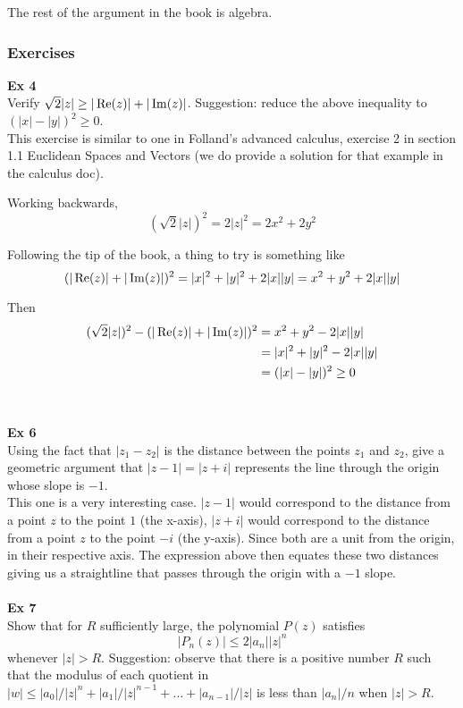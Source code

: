 The rest of the argument in the book is algebra.


\subsubsection{Exercises}

\textbf{Ex 4}
\\
Verify $\sqrt{2}|z| \geq |\operatorname{Re}(z)| + |\operatorname{Im}(z)|$.
Suggestion: reduce the above inequality to $(|x| - |y|)^2 \geq 0$.
\\

This exercise is similar to one in Folland's advanced calculus, exercise 2 in section 1.1 Euclidean Spaces and Vectors
(we do provide a solution for that example in the calculus doc).

Working backwards,
$$
(\sqrt{2} |z|)^2 = 2|z|^2 = 2x^2 + 2y^2
$$

Following the tip of the book, a thing to try is something like
$$
(|\operatorname{Re}(z)| + |\operatorname{Im}(z)|)^2 = |x|^2 + |y|^2 + 2|x||y| = x^2 + y^2 + 2|x||y|
$$

Then
\begin{align*}
(\sqrt{2} |z|)^2  -  (|\operatorname{Re}(z)| + |\operatorname{Im}(z)|)^2 &= x^2 + y^2 - 2|x||y| \\
&= |x|^2 + |y|^2 - 2|x||y| \\
&= (|x| - |y|)^2 \geq 0
\end{align*}
\\~\\


\textbf{Ex 6}
\\
Using the fact that $|z_1 - z_2|$ is the distance between the points $z_1$ and $z_2$,
give a geometric argument that $|z - 1| = |z + i|$ represents the line through the origin
whose slope is $-1$.
\\

This one is a very interesting case.
$|z-1|$ would correspond to the distance from a point $z$ to the point $1$ (the x-axis),
$|z+i|$ would correspond to the distance from a point $z$ to the point $-i$ (the y-axis).
Since both are a unit from the origin, in their respective axis.
The expression above then equates these two distances giving us a straightline that passes through
the origin with a $-1$ slope.
\\~\\


\textbf{Ex 7}
\\
Show that for $R$ sufficiently large, the polynomial $P(z)$ satisfies
$$
|P_n(z)| \leq 2 |a_n||z|^n
$$
whenever $|z| > R$.
Suggestion: observe that there is a positive number $R$ such that the modulus
of each quotient in $|w| \leq |a_0|/|z|^n + |a_1|/|z|^{n-1} + \ldots + |a_{n-1}|/|z|$
is less than $|a_n|/n$ when $|z| > R$.
\\


